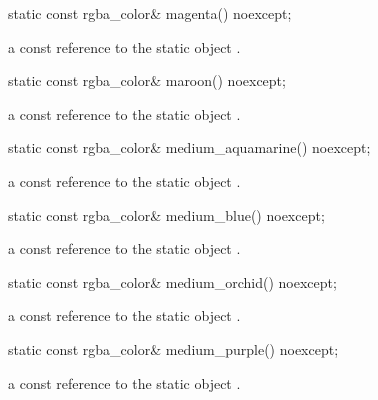 \begin{itemdecl}
static const rgba_color& magenta() noexcept;
\end{itemdecl}
\begin{itemdescr}
\pnum
\returns
a const reference to the static  object .
\end{itemdescr}

\begin{itemdecl}
static const rgba_color& maroon() noexcept;
\end{itemdecl}
\begin{itemdescr}
\pnum
\returns
a const reference to the static  object .
\end{itemdescr}

\begin{itemdecl}
static const rgba_color& medium_aquamarine() noexcept;
\end{itemdecl}
\begin{itemdescr}
\pnum
\returns
a const reference to the static  object .
\end{itemdescr}

\begin{itemdecl}
static const rgba_color& medium_blue() noexcept;
\end{itemdecl}
\begin{itemdescr}
\pnum
\returns
a const reference to the static  object .
\end{itemdescr}

\begin{itemdecl}
static const rgba_color& medium_orchid() noexcept;
\end{itemdecl}
\begin{itemdescr}
\pnum
\returns
a const reference to the static  object .
\end{itemdescr}

\begin{itemdecl}
static const rgba_color& medium_purple() noexcept;
\end{itemdecl}
\begin{itemdescr}
\pnum
\returns
a const reference to the static  object .
\end{itemdescr}

